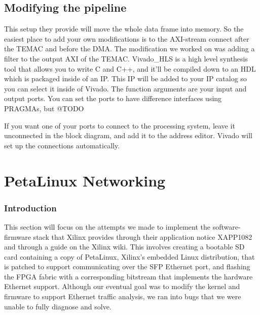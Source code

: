 \documentclass[12pt]{report}
\begin{document}
\section{Modifying the pipeline}
This setup they provide will move the whole data frame into memory. So the easiest place to add your own modifications is to the AXI-stream connect after the TEMAC and before the DMA. The modification we worked on was adding a filter to the output AXI of the TEMAC. Vivado\_HLS is a high level synthesis tool that allows you to write C and C++, and it'll be compiled down to an HDL which is packaged inside of an IP. This IP will be added to your IP catalog so you can select it inside of Vivado. The function arguments are your input and output ports. You can set the ports to have difference interfaces using PRAGMAs, but @TODO

If you want one of your ports to connect to the processing system, leave it unconnected in the block diagram, and add it to the address editor. Vivado will set up the connections automatically.

\chapter{PetaLinux Networking}
\subsection{Introduction}
This section will focus on the attempts we made to implement the software-firmware stack that Xilinx provides through their application notice XAPP1082 and through a guide on the Xilinx wiki. This involves creating a bootable SD card containing a copy of PetaLinux, Xilinx's embedded Linux distribution, that is patched to support communicating over the SFP Ethernet port, and flashing the FPGA fabric with a corresponding bitstream that implements the hardware Ethernet support. Although our eventual goal was to modify the kernel and firmware to support Ethernet traffic analysis, we ran into bugs that we were unable to fully diagnose and solve.
\end{document}
